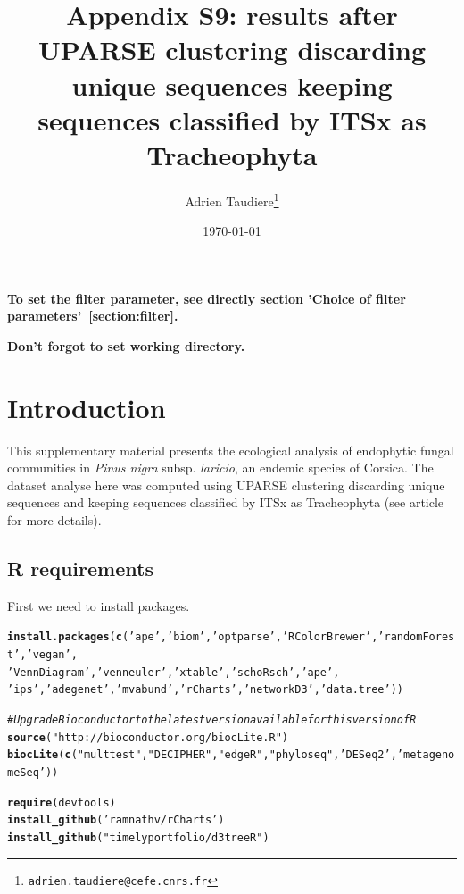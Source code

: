 \documentclass[12pt]{article}\usepackage[]{graphicx}\usepackage[]{color}
\title{Appendix S9: results after UPARSE clustering discarding unique sequences keeping sequences classified by ITSx as Tracheophyta}
\author{Adrien Taudiere\thanks{\texttt{adrien.taudiere@cefe.cnrs.fr}}}
\affil{{\footnotesize CEFE - Centre d'Ecologie Fonctionnelle et Evolutive, Montpellier: France}}
\date{\today}
\makeatletter
\newcommand{\hlstr}[1]{\textcolor[rgb]{0.192,0.494,0.8}{#1}}%
\newcommand{\hlcom}[1]{\textcolor[rgb]{0.678,0.584,0.686}{\textit{#1}}}%
\newcommand{\hlstd}[1]{\textcolor[rgb]{0.345,0.345,0.345}{#1}}%
\newcommand{\hlkwd}[1]{\textcolor[rgb]{0.737,0.353,0.396}{\textbf{#1}}}%
\newenvironment{kframe}{%
 \def\at@end@of@kframe{}%
 \ifinner\ifhmode%
  \def\at@end@of@kframe{\end{minipage}}%
  \begin{minipage}{\columnwidth}%
 \fi\fi%
 \def\FrameCommand##1{\hskip\@totalleftmargin \hskip-\fboxsep
 \colorbox{shadecolor}{##1}\hskip-\fboxsep
     \hskip-\linewidth \hskip-\@totalleftmargin \hskip\columnwidth}%
 \MakeFramed {\advance\hsize-\width
   \@totalleftmargin\z@ \linewidth\hsize
   \@setminipage}}%
 {\par\unskip\endMakeFramed%
 \at@end@of@kframe}
\newenvironment{knitrout}{}{} %
\numberwithin{figure}{section}
\makeatother
\begin{document}






\maketitle

\vfill
\begin{center}
\textbf{To set the filter parameter, see directly section 'Choice of filter parameters'~\ref{section:filter}.}

\textbf{Don't forgot to set working directory.}
\end{center}

\newpage
\tableofcontents
\newpage


\section{Introduction}

This supplementary material presents the ecological analysis of endophytic fungal communities in \textit{Pinus nigra} subsp. \textit{laricio}, an endemic species of Corsica. The dataset analyse here was computed using UPARSE clustering discarding unique sequences and keeping sequences classified by ITSx as Tracheophyta (see article for more details).

\subsection{R requirements}

First we need to install packages.
\begin{knitrout}\small
{}\color{fgcolor}\begin{kframe}
\begin{alltt}
\hlkwd{install.packages}\hlstd{(}\hlkwd{c}\hlstd{(}\hlstr{'ape'}\hlstd{,} \hlstr{'biom'}\hlstd{,} \hlstr{'optparse'}\hlstd{,} \hlstr{'RColorBrewer'}\hlstd{,} \hlstr{'randomForest'}\hlstd{,}  \hlstr{'vegan'}\hlstd{,}
                  \hlstr{'VennDiagram'}\hlstd{,} \hlstr{'venneuler'}\hlstd{,} \hlstr{'xtable'}\hlstd{,} \hlstr{'schoRsch'}\hlstd{,} \hlstr{'ape'}\hlstd{,}
                 \hlstr{'ips'}\hlstd{,} \hlstr{'adegenet'}\hlstd{,} \hlstr{'mvabund'}\hlstd{,} \hlstr{'rCharts'}\hlstd{,} \hlstr{'networkD3'}\hlstd{,} \hlstr{'data.tree'}\hlstd{))}

\hlcom{# Upgrade Bioconductor to the latest version available for this version of R}
\hlkwd{source}\hlstd{(}\hlstr{"http://bioconductor.org/biocLite.R"}\hlstd{)}
\hlkwd{biocLite}\hlstd{(}\hlkwd{c}\hlstd{(}\hlstr{"multtest"}\hlstd{,} \hlstr{"DECIPHER"}\hlstd{,} \hlstr{"edgeR"}\hlstd{,} \hlstr{"phyloseq"}\hlstd{,} \hlstr{'DESeq2'}\hlstd{,} \hlstr{'metagenomeSeq'}\hlstd{))}

\hlkwd{require}\hlstd{(devtools)}
\hlkwd{install_github}\hlstd{(}\hlstr{'ramnathv/rCharts'}\hlstd{)}
\hlkwd{install_github}\hlstd{(}\hlstr{"timelyportfolio/d3treeR"}\hlstd{)}
\end{alltt}
\end{kframe}
\end{knitrout}
\end{document}
